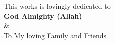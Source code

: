 \vspace*{\fill}
\begin{center}
	This works is lovingly dedicated to \\
	{\LARGE \textbf{God Almighty (Allah)}} \\
	\& \\
	To My loving Family and Friends
\end{center}
\vspace*{\fill}
\vspace{0.5cm}